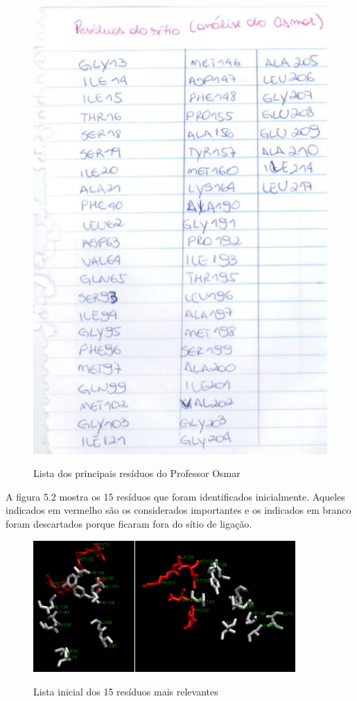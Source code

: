 \begin{figure}[h]
        \center
        \includegraphics[width=12cm]{images/ListaProfOsmar.png}
        \label{fig:rddworkflow}
        \caption{Lista dos principais resíduos do Professor Osmar}
\end{figure}

A figura 5.2 mostra os 15 resíduos que foram identificados inicialmente. Aqueles indicados em vermelho são os considerados importantes e os indicados em branco foram descartados porque ficaram fora do sítio de ligação.

\begin{figure}[h]
        \center
        \includegraphics[width=10cm]{images/avaliacao_Residuos_nomes.png}
        \label{fig:rddworkflow}
        \caption{Lista inicial dos 15 resíduos mais relevantes}
\end{figure}

